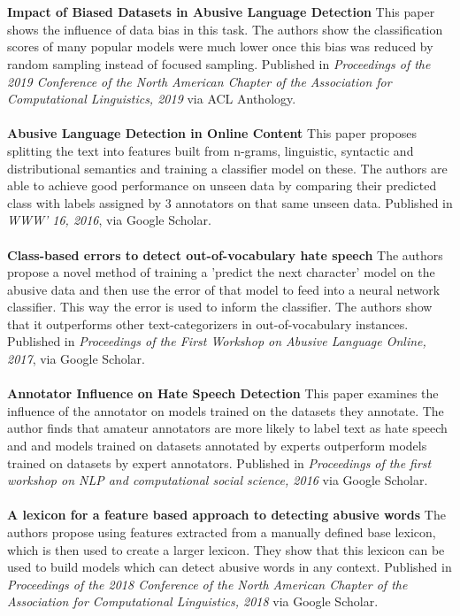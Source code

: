 \documentclass[a4]{article}
\begin{document}
\\
\\
\textbf{Impact of Biased Datasets in Abusive Language Detection} \cite{biasData} This paper shows the influence of data bias in this task. The authors show the classification scores of many popular models were much lower once this bias was reduced by random sampling instead of focused sampling. Published in \textit{Proceedings of the 2019 Conference of the North {A}merican Chapter of the Association for Computational Linguistics, 2019} via ACL Anthology.
\\
\\
\textbf{Abusive Language Detection in Online Content} \cite{abusiveLang} This paper proposes splitting the text into features built from n-grams, linguistic, syntactic and distributional semantics and training a classifier model on these. The authors are able to achieve good performance on unseen data by comparing their predicted class with labels assigned by 3 annotators on that same unseen data. Published in \textit{WWW' 16, 2016}, via Google Scholar.
\\
\\
\textbf{Class-based errors to detect out-of-vocabulary hate speech} \cite{classModel} The authors propose a novel method of training a 'predict the next character' model on the abusive data and then use the error of that model to feed into a neural network classifier. This way the error is used to inform the classifier. The authors show that it outperforms other text-categorizers in out-of-vocabulary instances. Published in \textit{Proceedings of the First Workshop on Abusive Language Online, 2017}, via Google Scholar.
\\
\\
\textbf{Annotator Influence on Hate Speech Detection} \cite{annoInf} This paper examines the influence of the annotator on models trained on the datasets they annotate. The author finds that amateur annotators are more likely to label text as hate speech and and models trained on datasets annotated by experts outperform models trained on datasets by expert annotators. Published in \textit{Proceedings of the first workshop on NLP and computational social science, 2016} via Google Scholar.
\\
\\
\textbf{A lexicon for a feature based approach to detecting abusive words}  \cite{lexiAbu} The authors propose using features extracted from a manually defined base lexicon, which is then used to create a larger lexicon. They show that this lexicon can be used to build models which can detect abusive words in any context. Published in \textit{Proceedings of the 2018 Conference of the North {A}merican Chapter of the Association for Computational Linguistics, 2018} via Google Scholar.



\end{document}
